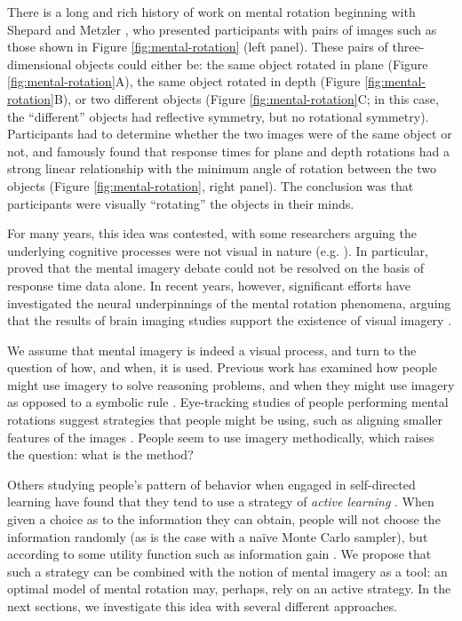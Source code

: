 \documentclass{article} %
\newcommand{\naive}[0]{na\"ive}
\begin{document}
There is a long and rich history of work on mental rotation beginning
with Shepard and Metzler \cite{Shepard1971}, who presented
participants with pairs of images such as those shown in Figure
\ref{fig:mental-rotation} (left panel). These pairs of
three-dimensional objects could either be: the same object rotated in
plane (Figure \ref{fig:mental-rotation}A), the same object rotated in
depth (Figure \ref{fig:mental-rotation}B), or two different objects
(Figure \ref{fig:mental-rotation}C; in this case, the ``different''
objects had reflective symmetry, but no rotational
symmetry). Participants had to determine whether the two images were
of the same object or not, and \cite{Shepard1971} famously found that
response times for plane and depth rotations had a strong linear
relationship with the minimum angle of rotation between the two
objects (Figure \ref{fig:mental-rotation}, right panel). The
conclusion was that participants were visually ``rotating'' the
objects in their minds.

For many years, this idea was contested, with some researchers arguing
the underlying cognitive processes were not visual in nature
(e.g. \cite{Pylyshyn1981}). In particular, \cite{Anderson1978} proved
that the mental imagery debate could not be resolved on the basis of
response time data alone. In recent years, however, significant
efforts have investigated the neural underpinnings of the mental
rotation phenomena, arguing that the results of brain imaging studies
support the existence of visual imagery \cite{Kosslyn1988,
  Kosslyn:2009tj}.

We assume that mental imagery is indeed a visual process, and turn to
the question of how, and when, it is used. Previous work has examined
how people might use imagery \cite{Hegarty2004, Schwartz1999} to solve
reasoning problems, and when they might use imagery as opposed to a
symbolic rule \cite{Schwartz:1996uy}. Eye-tracking studies of people
performing mental rotations suggest strategies that people might be
using, such as aligning smaller features of the images
\cite{Just1976}. People seem to use imagery methodically, which raises
the question: what is the method?

Others studying people's pattern of behavior when engaged in
self-directed learning have found that they tend to use a strategy of
\textit{active learning} \cite{Gureckis:2012gu, Markant:2012uu}. When
given a choice as to the information they can obtain, people will not
choose the information randomly (as is the case with a \naive{} Monte
Carlo sampler), but according to some utility function such as
information gain \cite{Nelson2007, Markant:2012uu}. We propose that
such a strategy can be combined with the notion of mental imagery as a
tool: an optimal model of mental rotation may, perhaps, rely on an
active strategy. In the next sections, we investigate this idea with
several different approaches.
\end{document}
